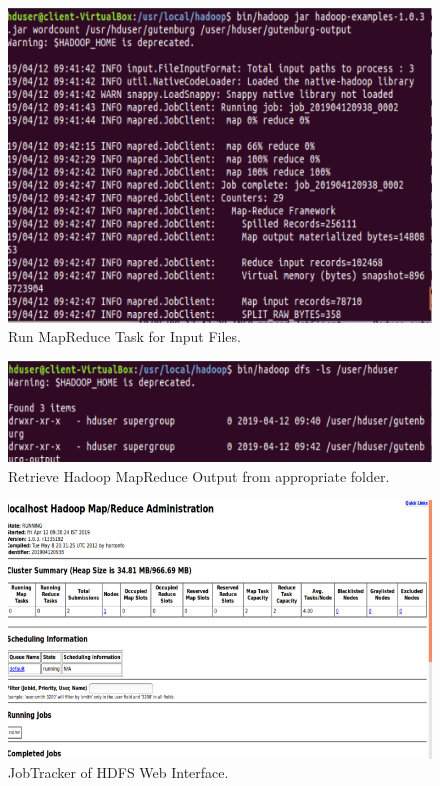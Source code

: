 \documentclass[a4paper,10pt]{article}
\begin{document}
\begin{figure}[h]
	\includegraphics[scale=0.30,center]{exptTwoScreenShot/fig5.png}
	\caption{Run MapReduce Task for Input Files.}
	\label{fig:5}
\end{figure}
\newpage
\begin{figure}[h]
	\includegraphics[scale=0.50,center]{exptTwoScreenShot/fig6.png}
	\caption{Retrieve Hadoop MapReduce Output from appropriate folder.}
	\label{fig:6}
\end{figure}

	\begin{figure}[h]
		\includegraphics[scale=0.30,center]{exptTwoScreenShot/fig7.png}
		\caption{JobTracker of HDFS Web Interface.}
		\label{fig:7}
	\end{figure}
	
\end{document}
